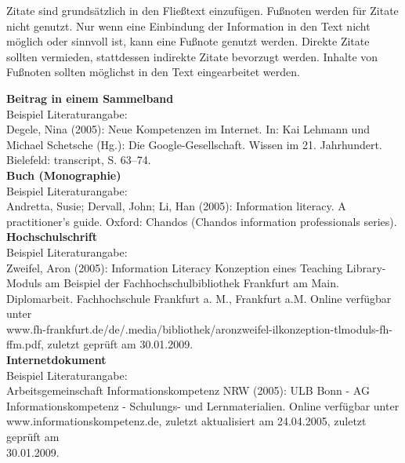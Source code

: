 Zitate sind grundsätzlich in den Fließtext einzufügen. Fußnoten werden für Zitate nicht genutzt. Nur wenn eine Einbindung der Information in den Text nicht möglich oder sinnvoll ist, kann eine Fußnote genutzt werden. Direkte Zitate sollten vermieden, stattdessen indirekte Zitate bevorzugt werden. Inhalte von Fußnoten sollten möglichst in den Text eingearbeitet werden.
$\;$\\
\begin{spacing}{1}
\textbf{Beitrag in einem Sammelband}\\

Beispiel Literaturangabe:\\

Degele, Nina (2005): Neue Kompetenzen im Internet. In: Kai Lehmann und Michael Schetsche (Hg.): Die Google-Gesellschaft. Wissen im 21. Jahrhundert. Bielefeld: transcript, S. 63–74. \\

\textbf{Buch (Monographie)}\\

Beispiel Literaturangabe:\\

Andretta, Susie; Dervall, John; Li, Han (2005): Information literacy. A practitioner's guide. Oxford: Chandos (Chandos information professionals series). \\

\textbf{Hochschulschrift}\\

Beispiel Literaturangabe:\\

Zweifel, Aron (2005): Information Literacy Konzeption eines Teaching Library-Moduls am Beispiel der Fachhochschulbibliothek Frankfurt am Main. Diplomarbeit. Fachhochschule Frankfurt a. M., Frankfurt a.M. Online verfügbar unter\\ www.fh-frankfurt.de/de/.media/bibliothek/aronzweifel-ilkonzeption-tlmoduls-fh-ffm.pdf, zuletzt geprüft am 30.01.2009.\\

\textbf{Internetdokument}\\

Beispiel Literaturangabe:\\

Arbeitsgemeinschaft Informationskompetenz NRW (2005): ULB Bonn - AG Informationskompetenz - Schulungs- und Lernmaterialien. Online verfügbar unter\\ www.informationskompetenz.de, zuletzt aktualisiert am 24.04.2005, zuletzt geprüft am\\ 30.01.2009.\\
\end{spacing}

